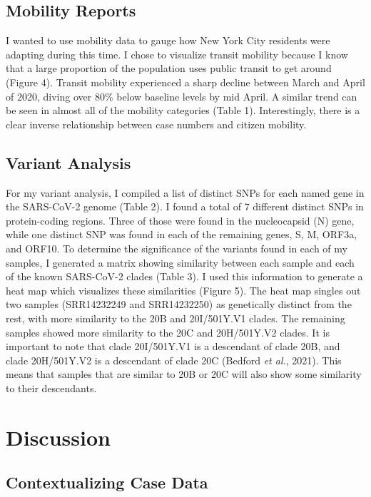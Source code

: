 \documentclass[
]{article}
\begin{document}
\hypertarget{mobility-reports}{%
\subsection{Mobility Reports}\label{mobility-reports}}

I wanted to use mobility data to gauge how New York City residents were
adapting during this time. I chose to visualize transit mobility because
I know that a large proportion of the population uses public transit to
get around (Figure 4). Transit mobility experienced a sharp decline
between March and April of 2020, diving over 80\% below baseline levels
by mid April. A similar trend can be seen in almost all of the mobility
categories (Table 1). Interestingly, there is a clear inverse
relationship between case numbers and citizen mobility.

\hypertarget{variant-analysis}{%
\subsection{Variant Analysis}\label{variant-analysis}}

For my variant analysis, I compiled a list of distinct SNPs for each
named gene in the SARS-CoV-2 genome (Table 2). I found a total of 7
different distinct SNPs in protein-coding regions. Three of those were
found in the nucleocapsid (N) gene, while one distinct SNP was found in
each of the remaining genes, S, M, ORF3a, and ORF10. To determine the
significance of the variants found in each of my samples, I generated a
matrix showing similarity between each sample and each of the known
SARS-CoV-2 clades (Table 3). I used this information to generate a heat
map which visualizes these similarities (Figure 5). The heat map singles
out two samples (SRR14232249 and SRR14232250) as genetically distinct
from the rest, with more similarity to the 20B and 20I/501Y.V1 clades.
The remaining samples showed more similarity to the 20C and 20H/501Y.V2
clades. It is important to note that clade 20I/501Y.V1 is a descendant
of clade 20B, and clade 20H/501Y.V2 is a descendant of clade 20C
(Bedford \emph{et al.}, 2021). This means that samples that are similar
to 20B or 20C will also show some similarity to their descendants.

\hypertarget{discussion}{%
\section{Discussion}\label{discussion}}

\hypertarget{contextualizing-case-data}{%
\subsection{Contextualizing Case Data}\label{contextualizing-case-data}}
\end{document}
